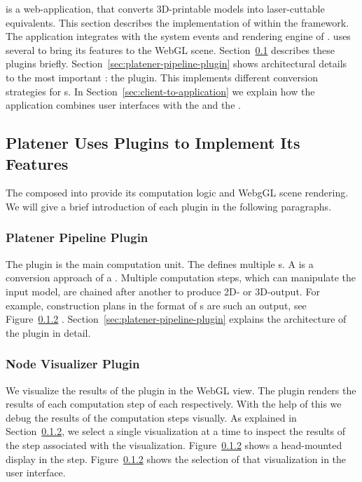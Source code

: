 \documentclass[../ClassicThesis.tex]{subfiles}
\begin{document}
{\platener} is a web-application, that converts 3D-printable models
into laser-cuttable equivalents. This section describes the
implementation of {\platener} within the {\convertify} framework. The
application integrates with the system events and rendering engine of
{\convertify}. {\platener} uses several  to bring its
features to the WebGL scene. Section~\ref{sec:platener-uses-plugins}
describes these plugins briefly.
Section~\ref{sec:platener-pipeline-plugin} shows architectural details
to the most important : the 
plugin. This  implements different conversion strategies
for {\threedmodel}s. In Section~\ref{sec:client-to-application} we
explain how the application combines user interfaces with the
 and the .

\subsection{Platener Uses Plugins to Implement Its Features}
\label{sec:platener-uses-plugins}

The  composed into {\platener} provide its
computation logic and WebgGL scene rendering. We will give a
brief introduction of each plugin in the following
paragraphs.

\subsubsection{Platener Pipeline Plugin}

The  plugin is the main computation unit.
The  defines multiple {\fabmethod}s. A
{\fabmethod} is a conversion approach of a \threedmodel.
Multiple computation steps, which can manipulate the input
model, are chained after another to produce 2D- or
3D-output. For example, construction plans in the format of
{\svgfile}s are such an output, see Figure~\ref{}
.
Section~\ref{sec:platener-pipeline-plugin} explains the
architecture of the  plugin in detail.

\subsubsection{Node Visualizer Plugin}

We visualize the results of the 
plugin in the WebGL view. The  plugin
renders the results of each computation step of each
{\fabmethod} respectively. With the help of this
 we debug the results of the computation steps
visually. As explained in Section~\ref{}, we select a single visualization at a
time to inspect the results of the step associated with the
visualization. Figure~\ref{} shows a
head-mounted display in the  step.
Figure~\ref{} shows the selection of that
visualization in the user interface.
\end{document}
